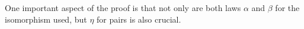 \documentclass[sigplan,review,anonymous]{acmart}
\begin{document}
\begin{code}
\AgdaSpace{}%
\AgdaSymbol{=}\AgdaSpace{}%
\AgdaSpace{}%
\AgdaSymbol{\{}\AgdaSpace{}%
\AgdaSymbol{(}\AgdaSpace{}%
\AgdaOperator{\AgdaInductiveConstructor{,}}\AgdaSpace{}%
\AgdaSymbol{)}\AgdaSpace{}%
\AgdaSpace{}%
\AgdaSymbol{(}\AgdaSpace{}%
\AgdaSpace{}%
\AgdaSymbol{(}\AgdaSpace{}%
\AgdaSymbol{\AgdaUnderscore{}))}\AgdaSpace{}%
\AgdaOperator{\AgdaInductiveConstructor{,}}\AgdaSpace{}%
\AgdaSpace{}%
\AgdaSpace{}%
\AgdaSymbol{(}\AgdaSpace{}%
\AgdaSymbol{\AgdaUnderscore{})\}}\<%
\\
%
\>[4]\AgdaSymbol{\}}\<%
\\
%
\>[2]\AgdaSymbol{\})}\<%
\end{code}

One important aspect of the proof is that not only are both laws $\alpha$ and $\beta$
for the isomorphism used, but $\eta$ for pairs is also crucial.
\end{document}
